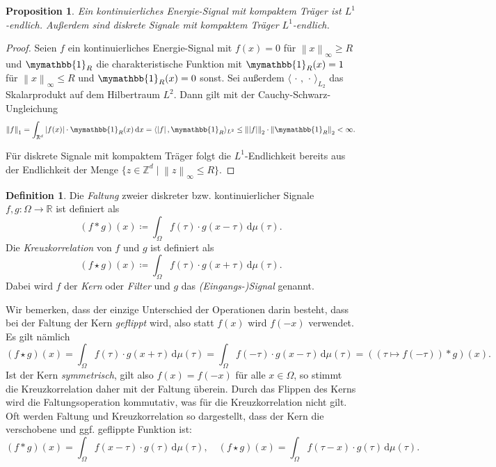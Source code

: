 \documentclass[paper=a4, 	%
		fontsize=11pt,
		abstract=true, 	%
		headsepline, 	%
		notitlepage	%
		]{scrartcl}
\newtheorem{proposition}[theorem]{Proposition}
\theoremstyle{definition}
\newtheorem{definition}[theorem]{Definition}
\newcommand{\R}{\mathbb{R}}
\newcommand{\Z}{\mathbb{Z}}
\newcommand{\diff}{\,\textrm{d}}
\newcommand{\norm}[1]{\left\lVert#1\right\rVert}
\newcommand{\abs}[1]{\left\lvert#1\right\rvert}
\begin{document}
\begin{proposition}
    Ein kontinuierliches Energie-Signal mit kompaktem Träger ist $L^1$-endlich.
    Außerdem sind diskrete Signale mit kompaktem Träger $L^1$-endlich.
\end{proposition}
\begin{proof}
    Seien $f$ ein kontinuierliches Energie-Signal mit $f(x) = 0$ für $\norm{x}_{\infty} \geq R$ und $\mymathbb{1}_R$ die charakteristische Funktion mit $\mymathbb{1}_R(x) = 1$ für $\norm{x}_\infty \leq R$ und $\mymathbb{1}_R(x) = 0$ sonst.
    Sei außerdem $\langle \,\cdot\, , \,\cdot\, \rangle_{L_2}$ das Skalarprodukt auf dem Hilbertraum $L^2$.
    Dann gilt mit der Cauchy-Schwarz-Ungleichung
    \[
        \norm{f}_1 
        = \int_{\R^d} \abs{f(x)} \cdot \mymathbb{1}_R(x) \diff x
        = \langle \abs{f}, \mymathbb{1}_R \rangle_{L^2}
        \leq \norm{\abs{f}}_2 \cdot \norm{\mymathbb{1}_R}_2 < \infty .
    \]

    Für diskrete Signale mit kompaktem Träger folgt die $L^1$-Endlichkeit bereits aus der Endlichkeit der Menge $\{ z\in\Z^d \mid \norm{z}_{\infty} \leq R\}$.
\end{proof}

\begin{definition}
    Die \emph{Faltung} zweier diskreter bzw. kontinuierlicher Signale $f,g: \Omega\rightarrow \R$ ist definiert als 
    \[
        (f * g)(x) \coloneqq \int_\Omega f(\tau) \cdot g(x-\tau) \diff \mu(\tau).
    \]
    Die \emph{Kreuzkorrelation} von $f$ und $g$ ist definiert als
    \[
        (f \star g)(x) \coloneqq \int_\Omega f(\tau) \cdot g(x+\tau) \diff \mu(\tau).
    \]
    Dabei wird $f$ der \emph{Kern} oder \emph{Filter} und $g$ das \emph{(Eingangs-)Signal} genannt.
\end{definition}

Wir bemerken, dass der einzige Unterschied der Operationen darin besteht, dass bei der Faltung der Kern \emph{geflippt} wird, also statt $f(x)$ wird $f(-x)$ verwendet.
Es gilt nämlich \[
    \left(f \star g\right)(x) = \int_{\Omega} f(\tau) \cdot g(x+\tau) \diff\mu(\tau) = \int_\Omega f(-\tau) \cdot g(x - \tau) \diff\mu(\tau) = \left((\tau\mapsto f(-\tau)) * g\right)(x).
\]
Ist der Kern \emph{symmetrisch}, gilt also $f(x) = f(-x)$ für alle $x\in\Omega$, so stimmt die Kreuzkorrelation daher mit der Faltung überein.
Durch das Flippen des Kerns wird die Faltungsoperation kommutativ, was für die Kreuzkorrelation nicht gilt.
Oft werden Faltung und Kreuzkorrelation so dargestellt, dass der Kern die verschobene und ggf. geflippte Funktion ist:
\[
    (f*g)(x) = \int_\Omega f(x - \tau) \cdot g(\tau)\diff\mu(\tau), \quad
    (f\star g)(x) = \int_\Omega f(\tau - x) \cdot g(\tau) \diff\mu(\tau).
\]
\end{document}
